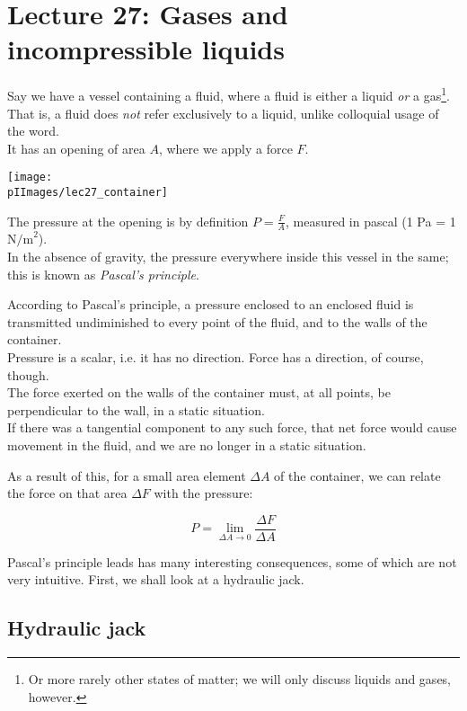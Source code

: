 \section{Lecture 27: Gases and incompressible liquids}

Say we have a vessel containing a fluid, where a fluid is either a liquid \emph{or} a gas\footnote{Or more rarely other states of matter; we will only discuss liquids and gases, however.}. That is, a fluid does \emph{not} refer exclusively to a liquid, unlike colloquial usage of the word.\\
It has an opening of area $A$, where we apply a force $F$.

\begin{center}
\texttt{[image: \\pIImages/lec27\_container]}
\end{center}

The pressure at the opening is by definition $\displaystyle P = \frac{F}{A}$, measured in pascal (1 Pa = 1 $\text{N/m}^2$).\\
In the absence of gravity, the pressure everywhere inside this vessel in the same; this is known as \emph{Pascal's principle}.

According to Pascal's principle, a pressure enclosed to an enclosed fluid is transmitted undiminished to every point of the fluid, and to the walls of the container.\\
Pressure is a scalar, i.e. it has no direction. Force has a direction, of course, though.\\
The force exerted on the walls of the container must, at all points, be perpendicular to the wall, in a static situation.\\
If there was a tangential component to any such force, that net force would cause movement in the fluid, and we are no longer in a static situation.

As a result of this, for a small area element $\Delta A$ of the container, we can relate the force on that area $\Delta F$ with the pressure:

\begin{equation}
P = \lim_{\Delta A \to 0} \frac{\Delta F}{\Delta A}
\end{equation}

Pascal's principle leads has many interesting consequences, some of which are not very intuitive. First, we shall look at a hydraulic jack.

\subsection{Hydraulic jack}

